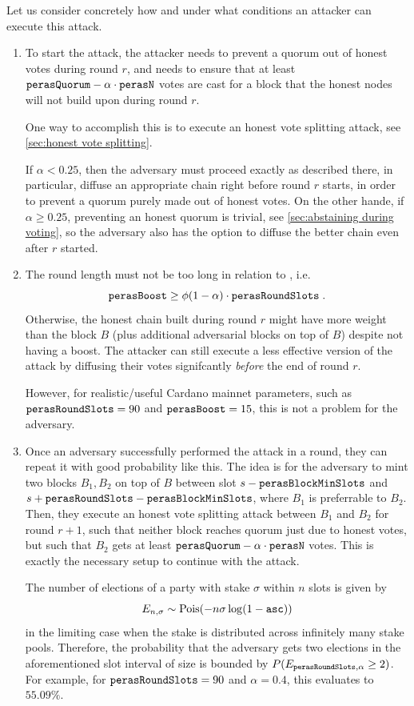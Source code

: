 \medskip
Let us consider concretely how and under what conditions an attacker can execute this attack.
\begin{enumerate}
\item
  To start the attack, the attacker needs to prevent a quorum out of honest votes during round $r$, and needs to ensure that at least $\mathtt{perasQuorum} - \alpha\cdot \mathtt{perasN}$ votes are cast for a block that the honest nodes will not build upon during round $r$.

  One way to accomplish this is to execute an honest vote splitting attack, see \cref{sec:honest vote splitting}.

  If $\alpha<0.25$, then the adversary must proceed exactly as described there, in particular, diffuse an appropriate chain right before round $r$ starts, in order to prevent a quorum purely made out of honest votes.
  On the other hande, if $\alpha\ge 0.25$, preventing an honest quorum is trivial, see \cref{sec:abstaining during voting}, so the adversary also has the option to diffuse the better chain even after $r$ started.
\item
  The round length \perasRoundSlots{} must not be too long in relation to \perasBoost{}, i.e.
  \[ \mathtt{perasBoost} \ge \phi(1-\alpha)\cdot \mathtt{perasRoundSlots} \;. \]
  Otherwise, the honest chain built during round $r$ might have more weight than the block $B$ (plus additional adversarial blocks on top of $B$) despite not having a boost.
  The attacker can still execute a less effective version of the attack by diffusing their votes signifcantly \emph{before} the end of round $r$.

  However, for realistic/useful Cardano mainnet parameters, such as $\mathtt{perasRoundSlots} = 90$ and $\mathtt{perasBoost} = 15$, this is not a problem for the adversary.
\item
  Once an adversary successfully performed the attack in a round, they can repeat it with good probability like this.
  The idea is for the adversary to mint two blocks $B_1,B_2$ on top of $B$ between slot $s-\mathtt{perasBlockMinSlots}$ and $s+\mathtt{perasRoundSlots} -\mathtt{perasBlockMinSlots}$, where $B_1$ is preferrable to $B_2$.
  Then, they execute an honest vote splitting attack between $B_1$ and $B_2$ for round $r+1$, such that neither block reaches quorum just due to honest votes, but such that $B_2$ gets at least $\mathtt{perasQuorum} - \alpha\cdot \mathtt{perasN}$ votes.
  This is exactly the necessary setup to continue with the attack.

  The number of elections of a party with stake $\sigma$ within $n$ slots is given by
  \[ E_{n,\sigma}\sim\operatorname{Pois}(-n\sigma\log(1-\mathtt{asc})) \]
  in the limiting case when the stake is distributed across infinitely many stake pools.
  Therefore, the probability that the adversary gets two elections in the aforementioned slot interval of size \perasRoundSlots{} is bounded by $P(E_{\mathtt{perasRoundSlots},\alpha}\ge 2)$.
  For example, for $\mathtt{perasRoundSlots} = 90$ and $\alpha=0.4$, this evaluates to $55.09\%$.


\end{enumerate}

